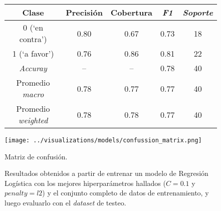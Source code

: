 \begin{figure}
    \begin{minipage}[b]{.6\linewidth}
    \centering
        \begin{adjustbox}{max width=\textwidth}
        \begin{tabular}{ *{5}{|c}| }
        \hline
        Clase & Precisión & Cobertura & \textit{F1} & \textit{Soporte} \\
        \hline{} (`en contra') & 0.80 & 0.67 & 0.73 & 18 \\
         (`a favor') & 0.76 & 0.86 & 0.81  & 22 \\
        \hline\hline
        \textit{Accuray} & {--} & {--} & 0.78 & 40 \\
        \hline
        Promedio \textit{macro} & 0.78 & 0.77 & 0.77 & 40 \\
        \hline
        Promedio \textit{weighted} & 0.78 & 0.78 & 0.77 & 40 \\
        \hline
        \end{tabular}
        \end{adjustbox}
        \label{table-results-models-held-out}
    \end{minipage}\hfill
    \begin{minipage}[t]{.35\linewidth}
      \centering
        \texttt{[image: ../visualizations/models/confussion\_matrix.png]}
        \caption{Matriz de confusión.}
        \label{fig-results-models-held-out}
    \end{minipage}
    \caption*{Resultados obtenidos a partir de entrenar un modelo de
    Regresión Logística con los mejores hiperparámetros hallados
    ($C=0.1$ y $penalty=l2$) y el conjunto completo de datos de entrenamiento,
    y luego evaluarlo con el \textit{dataset} de testeo.}
  \end{figure}

